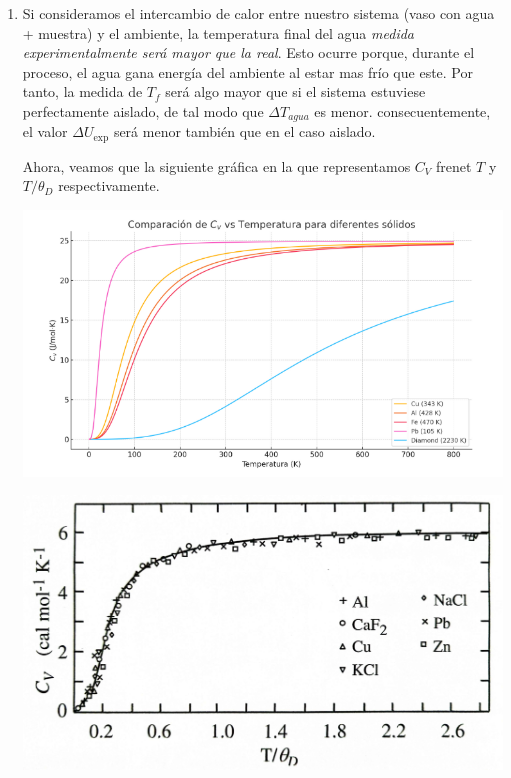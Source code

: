 \begin{enumerate}[label=\alph*)]
	\item Si consideramos el intercambio de calor entre nuestro sistema (vaso con agua + muestra) y el ambiente, la temperatura final del agua \textit{medida experimentalmente será mayor que la real}. Esto ocurre porque, durante el proceso, el agua gana energía del ambiente al estar mas frío que este. Por tanto, la medida de $T_f$ será algo mayor que si el sistema estuviese perfectamente aislado, de tal modo que $\Delta T_{agua}$ es menor. consecuentemente, el valor $\Delta U_{\exp}$ será menor también que en el caso aislado.

	      Ahora, veamos que la siguiente gráfica en la que representamos $C_V$ frenet $T$ y $T/\theta_D$ respectivamente.

	      \begin{minipage}{0.47\linewidth}
		      \includegraphics[width=1\linewidth]{Cuerpo/Ch_02/Examen_24_5-2.png}
	      \end{minipage} \hfill
	      \begin{minipage}{0.47\linewidth}
		      \includegraphics[width=1\linewidth]{Cuerpo/Ch_02/Examen_24_5-3.png}
	      \end{minipage}


\end{enumerate}
